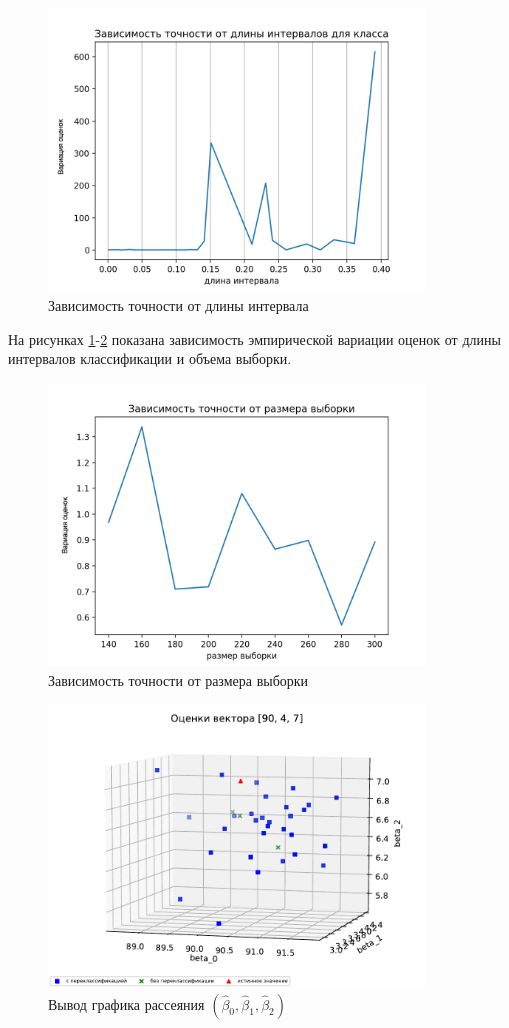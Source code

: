 \documentclass[a4paper,14pt]{extarticle}
\begin{document}
\newpage
\begin{figure}[ht]
    \centering
    \includegraphics[width=100mm]{pics/plot_90_4_accuracy-length.png}
    \caption{Зависимость точности от длины интервала\label{overflow}}
    \label{pic_4}
\end{figure} 
На рисунках \ref{pic_4}-\ref{pic_5} показана зависимость эмпирической вариации оценок от длины интервалов классификации и объема выборки.
\begin{figure}[hb]
    \centering
    \includegraphics[width=100mm]{pics/plot_90_4_accuracy-samplesize.png}
    \caption{Зависимость точности от размера выборки\label{overflow}}
    \label{pic_5}
\end{figure}
\newpage
\begin{figure}[h]
    \centering
    \includegraphics[width=100mm]{pics/plot_90_4_7_(4).pdf}
    \caption{Вывод графика рассеяния $(\hat{\beta}_0,\hat{\beta}_1, \hat{\beta}_2)$\label{overflow}}
\end{figure}
\end{document}
